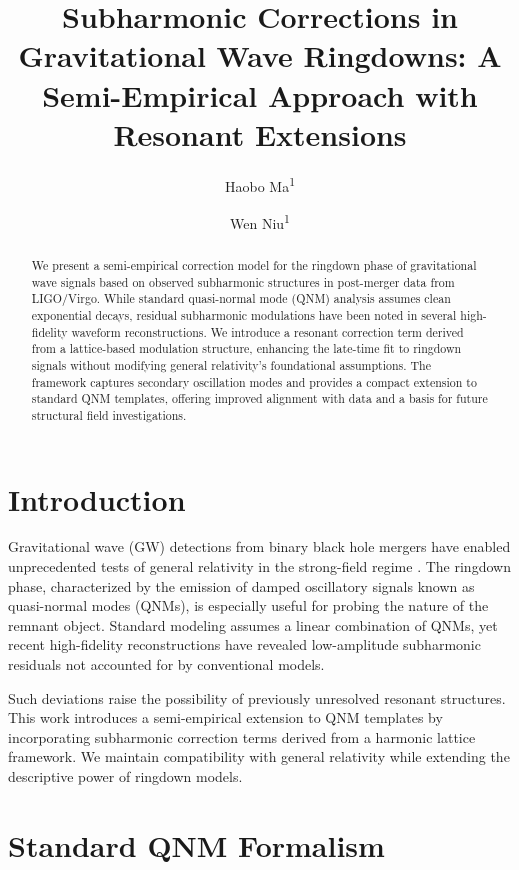 \documentclass[a4paper,12pt]{article}
\title{Subharmonic Corrections in Gravitational Wave Ringdowns: A Semi-Empirical Approach with Resonant Extensions}
\author{Haobo Ma\textsuperscript{1} \and Wen Niu\textsuperscript{1}}
\date{\vspace{-5ex}}
\begin{document}
\maketitle

\begin{abstract}
We present a semi-empirical correction model for the ringdown phase of gravitational wave signals based on observed subharmonic structures in post-merger data from LIGO/Virgo. While standard quasi-normal mode (QNM) analysis assumes clean exponential decays, residual subharmonic modulations have been noted in several high-fidelity waveform reconstructions. We introduce a resonant correction term derived from a lattice-based modulation structure, enhancing the late-time fit to ringdown signals without modifying general relativity's foundational assumptions. The framework captures secondary oscillation modes and provides a compact extension to standard QNM templates, offering improved alignment with data and a basis for future structural field investigations.
\end{abstract}

\section{Introduction}
\label{sec:intro}

Gravitational wave (GW) detections from binary black hole mergers have enabled unprecedented tests of general relativity in the strong-field regime \cite{abbott2016observation, berti2009quasinormal}. The ringdown phase, characterized by the emission of damped oscillatory signals known as quasi-normal modes (QNMs), is especially useful for probing the nature of the remnant object. Standard modeling assumes a linear combination of QNMs, yet recent high-fidelity reconstructions \cite{giesler2019black, isi2019testing} have revealed low-amplitude subharmonic residuals not accounted for by conventional models.

Such deviations raise the possibility of previously unresolved resonant structures. This work introduces a semi-empirical extension to QNM templates by incorporating subharmonic correction terms derived from a harmonic lattice framework. We maintain compatibility with general relativity while extending the descriptive power of ringdown models.

\section{Standard QNM Formalism}
\label{sec:standard_qnm}
\end{document}
